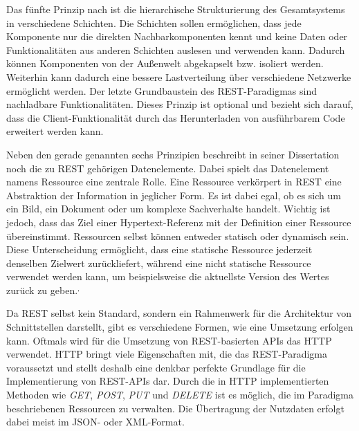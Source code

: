 Das fünfte Prinzip nach \citeauthor{MS-Fielding.} ist die hierarchische Strukturierung des Gesamtsystems in verschiedene Schichten. 
Die Schichten sollen ermöglichen, dass jede Komponente nur die direkten Nachbarkomponenten kennt und keine Daten oder Funktionalitäten aus anderen Schichten auslesen und verwenden kann.
Dadurch können Komponenten von der Außenwelt abgekapselt bzw. isoliert werden.
Weiterhin kann dadurch eine bessere Lastverteilung über verschiedene Netzwerke ermöglicht werden.
Der letzte Grundbaustein des \ac{REST}-Paradigmas sind nachladbare Funktionalitäten.
Dieses Prinzip ist optional und bezieht sich darauf, dass die Client-Funktionalität durch das Herunterladen von ausführbarem Code erweitert werden kann. 

Neben den gerade genannten sechs Prinzipien beschreibt \citeauthor{MS-Fielding.} in seiner Dissertation noch die zu \ac{REST} gehörigen Datenelemente. 
Dabei spielt das Datenelement namens Ressource eine zentrale Rolle.
Eine Ressource verkörpert in \ac{REST} eine Abstraktion der Information in jeglicher Form.
Es ist dabei egal, ob es sich um ein Bild, ein Dokument oder um komplexe Sachverhalte handelt. 
Wichtig ist jedoch, dass das Ziel einer Hypertext-Referenz mit der Definition einer Ressource übereinstimmt.
Ressourcen selbst können entweder statisch oder dynamisch sein.
Diese Unterscheidung ermöglicht, dass eine statische Ressource jederzeit denselben Zielwert zurückliefert, während eine nicht statische Ressource verwendet werden kann, um beispielsweise die aktuellste Version des Wertes zurück zu geben.\autocite[Vgl.][S. 86-90]{MS-Fielding.}$^,$\autocite{rf-richardson2013restful}

Da \ac{REST} selbst kein Standard, sondern ein Rahmenwerk für die Architektur von Schnittstellen darstellt, gibt es verschiedene Formen, wie eine Umsetzung erfolgen kann. 
Oftmals wird für die Umsetzung von \ac{REST}-basierten \acp{API} das \ac{HTTP} verwendet.
\ac{HTTP} bringt viele Eigenschaften mit, die das \ac{REST}-Paradigma voraussetzt und stellt deshalb eine denkbar perfekte Grundlage für die Implementierung von \ac{REST}-\acp{API} dar. 
Durch die in \ac{HTTP} implementierten Methoden wie \emph{GET}, \emph{POST}, \emph{PUT} und \emph{DELETE} ist es möglich, die im Paradigma beschriebenen Ressourcen zu verwalten.
Die Übertragung der Nutzdaten erfolgt dabei meist im \acs{JSON}- oder \acs{XML}-Format.\autocite[Vgl.][S. 97]{MS-Tilkov.2015} 

